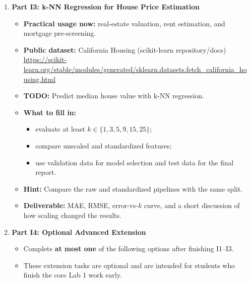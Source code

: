 \begin{enumerate}[label=\textbf{I\arabic*.}]
  \item \textbf{Part I3: k-NN Regression for House Price Estimation}
  \begin{itemize}
    \item \textbf{Practical usage now:} real-estate valuation, rent estimation, and mortgage pre-screening.
    \item \textbf{Public dataset:} California Housing (scikit-learn repository/docs)\\
    \url{https://scikit-learn.org/stable/modules/generated/sklearn.datasets.fetch_california_housing.html}
    \item \textbf{TODO:} Predict median house value with k-NN regression.
    \item \textbf{What to fill in:}
    \begin{itemize}
      \item evaluate at least $k \in \{1,3,5,9,15,25\}$;
      \item compare unscaled and standardized features;
      \item use validation data for model selection and test data for the final report.
    \end{itemize}
    \item \textbf{Hint:} Compare the raw and standardized pipelines with the same split.
    \item \textbf{Deliverable:} MAE, RMSE, error-vs-$k$ curve, and a short discussion of how scaling changed the results.
  \end{itemize}

  \item \textbf{Part I4: Optional Advanced Extension}
  \begin{itemize}
    \item Complete \textbf{at most one} of the following options after finishing I1--I3.
    \item These extension tasks are optional and are intended for students who finish the core Lab 1 work early.
  \end{itemize}


\end{enumerate}
